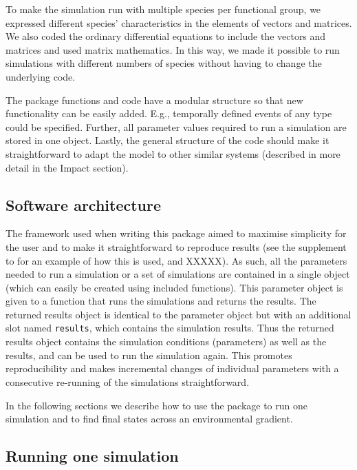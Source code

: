 \documentclass[]{elsarticle} %
\begin{document}
To make the simulation run with multiple species per functional group, we expressed different species' characteristics in the elements of vectors and matrices. We also coded the ordinary differential equations to include the vectors and matrices and used matrix mathematics. In this way, we made it possible to run simulations with different numbers of species without having to change the underlying code.

The package functions and code have a modular structure so that new functionality can be easily added. E.g., temporally defined events of any type could be specified. Further, all parameter values required to run a simulation are stored in one object. Lastly, the general structure of the code should make it straightforward to adapt the model to other similar systems (described in more detail in the Impact section).

\hypertarget{software-architecture}{%
\subsection{Software architecture}\label{software-architecture}}

The framework used when writing this package aimed to maximise simplicity for the user and to make it straightforward to reproduce results (see the supplement \citep{Petchey2022} to \citet{Limberger2023} for an example of how this is used, and XXXXX). As such, all the parameters needed to run a simulation or a set of simulations are contained in a single object (which can easily be created using included functions). This parameter object is given to a function that runs the simulations and returns the results. The returned results object is identical to the parameter object but with an additional slot named \texttt{results}, which contains the simulation results. Thus the returned results object contains the simulation conditions (parameters) as well as the results, and can be used to run the simulation again. This promotes reproducibility and makes incremental changes of individual parameters with a consecutive re-running of the simulations straightforward.

In the following sections we describe how to use the package to run one simulation and to find final states across an environmental gradient.

\hypertarget{running-one-simulation}{%
\subsection{Running one simulation}\label{running-one-simulation}}
\end{document}
